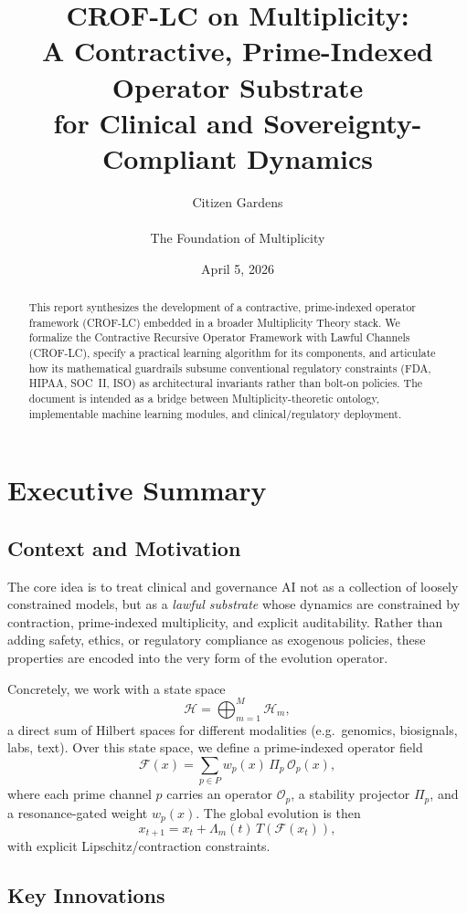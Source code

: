 \documentclass[11pt]{article}
\title{%
  CROF-LC on Multiplicity: \\
  A Contractive, Prime-Indexed Operator Substrate \\
  for Clinical and Sovereignty-Compliant Dynamics
}
\author{Citizen Gardens \\ \\ The Foundation of Multiplicity}
\date{April 5, 2026}
\begin{document}
\maketitle

\begin{abstract}
This report synthesizes the development of a contractive, prime-indexed operator framework (CROF-LC) embedded in a broader Multiplicity Theory stack.
We formalize the Contractive Recursive Operator Framework with Lawful Channels (CROF-LC), specify a practical learning algorithm for its components, and articulate how its mathematical guardrails subsume conventional regulatory constraints (FDA, HIPAA, SOC~II, ISO) as architectural invariants rather than bolt-on policies.
The document is intended as a bridge between Multiplicity-theoretic ontology, implementable machine learning modules, and clinical/regulatory deployment.
\end{abstract}
\newpage
\tableofcontents
\newpage
\section{Executive Summary}

\subsection{Context and Motivation}

The core idea is to treat clinical and governance AI not as a collection of loosely constrained models, but as a \emph{lawful substrate} whose dynamics are constrained by contraction, prime-indexed multiplicity, and explicit auditability.
Rather than adding safety, ethics, or regulatory compliance as exogenous policies, these properties are encoded into the very form of the evolution operator.

Concretely, we work with a state space
\[
  \mathcal{H} = \bigoplus_{m=1}^{M} \mathcal{H}_m,
\]
a direct sum of Hilbert spaces for different modalities (e.g.\ genomics, biosignals, labs, text).
Over this state space, we define a prime-indexed operator field
\[
  \mathcal{F}(x) = \sum_{p \in P} w_p(x)\,\Pi_p\,\mathcal{O}_p(x),
\]
where each prime channel \(p\) carries an operator \(\mathcal{O}_p\), a stability projector \(\Pi_p\), and a resonance-gated weight \(w_p(x)\).
The global evolution is then
\[
  x_{t+1} = x_t + \Lambda_m(t)\,T(\mathcal{F}(x_t)),
\]
with explicit Lipschitz/contraction constraints.

\subsection{Key Innovations}
\end{document}
